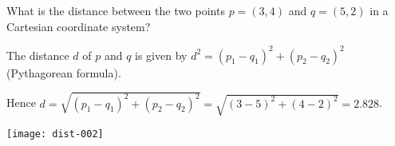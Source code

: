 
\begin{question}
What is the distance between the two points
$p = (3, 4)$ and $q = (5, 2)$
in a Cartesian coordinate system?
\end{question}

\begin{solution}
The distance $d$ of $p$ and $q$ is given by
$d^2 = (p_1 - q_1)^2 + (p_2 - q_2)^2$ (Pythagorean formula).

Hence $d = \sqrt{(p_1 - q_1)^2 + (p_2 - q_2)^2} =
  \sqrt{(3 - 5)^2 + (4 - 2)^2}
   = 2.828$.

\texttt{[image: dist-002]}
\end{solution}

